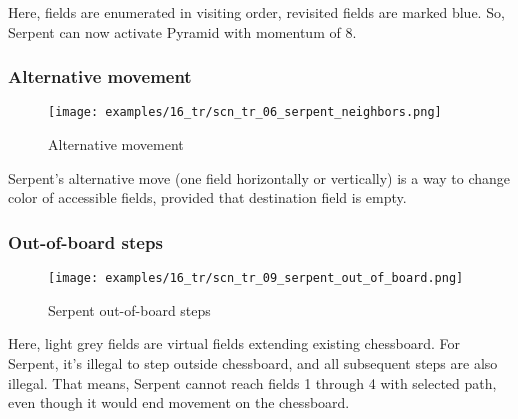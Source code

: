Here, fields are enumerated in visiting order, revisited fields are marked
blue. So, Serpent can now activate Pyramid with momentum of 8.

\clearpage %

\subsubsection*{Alternative movement}

\noindent
\begin{wrapfigure}[5]{l}{0.4\textwidth}
\centering
\texttt{[image: examples/16\_tr/scn\_tr\_06\_serpent\_neighbors.png]}
\caption{Alternative movement}
\label{fig:scn_tr_06_serpent_neighbors}
\end{wrapfigure}
Serpent's alternative move (one field horizontally or vertically) is a way to
change color of accessible fields, provided that destination field is empty.

\clearpage %

\subsubsection*{Out-of-board steps}

\vspace*{-1.0\baselineskip}
\noindent
\begin{figure}[!h]
\texttt{[image: examples/16\_tr/scn\_tr\_09\_serpent\_out\_of\_board.png]}
\caption{Serpent out-of-board steps}
\label{fig:scn_tr_09_serpent_out_of_board}
\end{figure}

Here, light grey fields are virtual fields extending existing chessboard.
For Serpent, it's illegal to step outside chessboard, and all subsequent
steps are also illegal. That means, Serpent cannot reach fields 1 through
4 with selected path, even though it would end movement on the chessboard.

\clearpage %


